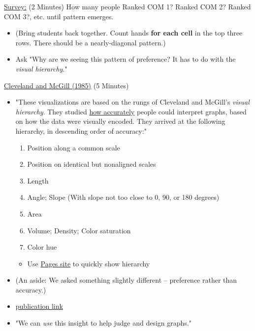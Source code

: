 \documentclass[11pt]{article}
\begin{document}
\uline{Survey:} (2 Minutes) How many people Ranked COM 1? Ranked COM 2? Ranked COM 3?, etc. until
pattern emerges.
\begin{itemize}
\item (Bring students back together. Count hands \textbf{for each cell} in the top three
rows. There should be a nearly-diagonal pattern.)
\item Ask "Why are we seeing this pattern of preference? It has to do with the
\emph{visual hierarchy}."
\end{itemize}

\uline{Cleveland and McGill (1985)} (5 Minutes)
\begin{itemize}
\item "These visualizations are based on the rungs of Cleveland and McGill's \emph{visual
hierarchy}. They studied \uline{how accurately} people could interpret graphs, based
on how the data were visually encoded. They arrived at the following
hierarchy, in descending order of accuracy:"
\begin{enumerate}
\item Position along a common scale
\item Position on identical but nonaligned scales
\item Length
\item Angle; Slope (With slope not too close to 0, 90, or 180 degrees)
\item Area
\item Volume; Density; Color saturation
\item Color hue
\end{enumerate}
\begin{itemize}
\item Use \href{https://citrineinformatics.github.io/ga-tech-workshop/05-vis-principles/index.html}{Pages site} to quickly show hierarchy
\end{itemize}
\item (An aside: We asked something slightly different -- preference rather than accuracy.)
\item \href{https://ils.unc.edu/courses/2015\_spring/inls541\_001/Readings/Cleveland\%20and\%20McGill\%201985\%20-\%20Graphical\%20Perception\%20and\%20Cleveland1985-Graphical\%20Methods\%20for\%20Analyzing\%20Scientific\%20Data.pdf}{publication link}

\item "We can \emph{use} this insight to help judge and design graphs."
\end{itemize}
\end{document}

